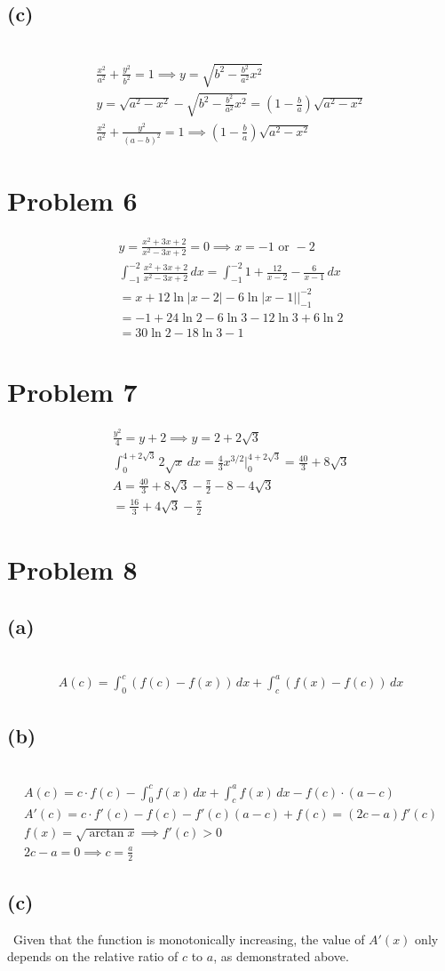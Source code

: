 \documentclass[12pt]{article}
\newcommand{\tor}{\text{ or }}
\newcommand{\problem}[1]{\section{Problem #1}}
\newcommand{\subproblem}[1]{\subsection{(#1)} \,}
\begin{document}
\subproblem{c}
\begin{gather*}
    \frac{x^2}{a^2}+\frac{y^2}{b^2} = 1 \implies y=\sqrt{b^2-\frac{b^2}{a^2}x^2}\\
    y=\sqrt{a^2-x^2}- \sqrt{b^2-\frac{b^2}{a^2}x^2} = (1-\frac{b}{a})\sqrt{a^2-x^2}\\
    \frac{x^2}{a^2} + \frac{y^2}{(a-b)^2}=1 \implies (1-\frac{b}{a})\sqrt{a^2-x^2}
\end{gather*}

\problem{6}

\begin{gather*}
    y=\frac{x^2+3x+2}{x^2-3x+2} = 0\implies x=-1\tor -2\\
    \int_{-1}^{-2} \frac{x^2+3x+2}{x^2-3x+2}\, dx = \int_{-1}^{-2} 1+ \frac{12}{x-2} -\frac{6}{x-1}\, dx\\
    = x +12\ln |x-2|-6\ln |x-1| \Big|_{-1}^{-2}\\
    = -1 +24\ln 2-6\ln 3- 12\ln 3+6\ln 2\\
    =\boxed{30\ln 2 -18 \ln 3-1}
\end{gather*}

\problem{7}

\begin{gather*}
    \frac{y^2}{4}=y+2 \implies y=2+2\sqrt{3}\\
    \int_{0}^{4 + 2\sqrt{3}} 2\sqrt{x} \, dx = \frac{4}{3}x^{3/2} \Big|_{0}^{4 + 2\sqrt{3}} = \frac{40}{3} + 8\sqrt{3}\\
    A=\frac{40}{3} + 8\sqrt{3}- \frac{\pi}{2} - 8 - 4\sqrt{3}\\
    =\boxed{\frac{16}{3} +4\sqrt{3}- \frac{\pi}{2}}
\end{gather*}

\problem{8}

\subproblem{a}
\begin{gather*}
    A(c) = \int_{0}^{c} (f(c) - f(x)) \, dx + \int_{c}^{a} (f(x) - f(c)) \, dx
\end{gather*}

\subproblem{b}
\begin{gather*}
    A(c) = c \cdot f(c)-\int_0^c f(x)\, dx +\int_c^af(x)\, dx -f(c) \cdot (a-c)\\
    A'(c)=c\cdot f'(c) - f(c) - f'(c)(a-c)+ f(c)= \boxed{(2c-a)f'(c)}\\
    f(x)=\sqrt{\arctan x} \implies f'(c)>0\\
    2c-a =0 \implies \boxed{c=\frac{a}{2}}
\end{gather*}   

\subproblem{c}
Given that the function is monotonically increasing, the value of $A'(x)$ only depends on the relative ratio of $c$ to $a$, as demonstrated above. 
\end{document}
